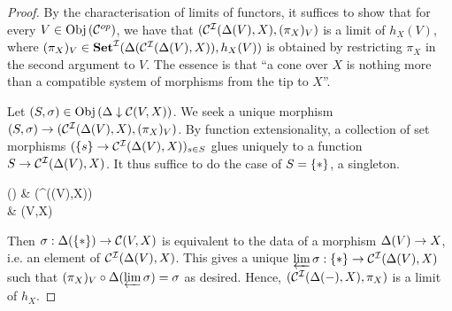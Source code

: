 \begin{proof}
  By the characterisation of limits of functors,
  it suffices to show that for every $V \in \mathrm{Obj}\left(\mathcal{C}^{op}\right)$,
  we have that 
  $(\mathcal{C}^{\mathcal{I}}(\Delta(V),X),(\pi_X)_V)$ is a limit of $h_X(V)$,
  where $(\pi_X)_V \in \mathbf{Set}^{\mathcal{I}}(\Delta(\mathcal{C}^{\mathcal{I}}(\Delta(V),X)),h_X(V))$ is obtained by 
  restricting $\pi_X$ in the second argument to $V$.
  The essence is that ``a cone over $X$ is nothing more than 
  a compatible system of morphisms from the tip to $X$''.

  Let $(S,\sigma) \in \mathrm{Obj}\left(\Delta\downarrow\mathcal{C}(V,X)\right)$.
  We seek a unique morphism $(S,\sigma) \to (\mathcal{C}^{\mathcal{I}}(\Delta(V),X),(\pi_X)_V)$.
  By function extensionality, 
  a collection of set morphisms $(\left\{s\right\} \to \mathcal{C}^{\mathcal{I}}(\Delta(V),X))_{s\in S}$
  glues uniquely to a function $S \to \mathcal{C}^{\mathcal{I}}(\Delta(V),X)$.
  It thus suffice to do the case of $S = \left\{*\right\}$, a singleton.
  \begin{cd}
    \De(\set{*})  
      \ar[rd,"\si"{swap}] & 
    \De(\CC^\II(\De(V),X)) \ar[d,"(\pi_X)_V"]\\
    & \CC(V,X)
  \end{cd}
  Then $\sigma : \Delta(\left\{*\right\}) \to \mathcal{C}(V,X)$ is equivalent to the data of
  a morphism $\Delta(V) \to X$, i.e. an element of $\mathcal{C}^{\mathcal{I}}(\Delta(V),X)$.
  This gives a unique $\varprojlim \sigma : \left\{*\right\} \to \mathcal{C}^{\mathcal{I}}(\Delta(V),X)$ such that 
  $(\pi_X)_V \circ \Delta(\varprojlim \sigma) = \sigma$ as desired.
  Hence, $(\mathcal{C}^{\mathcal{I}}(\Delta(-),X),\pi_X)$ is a limit of $h_X$.



\end{proof}

